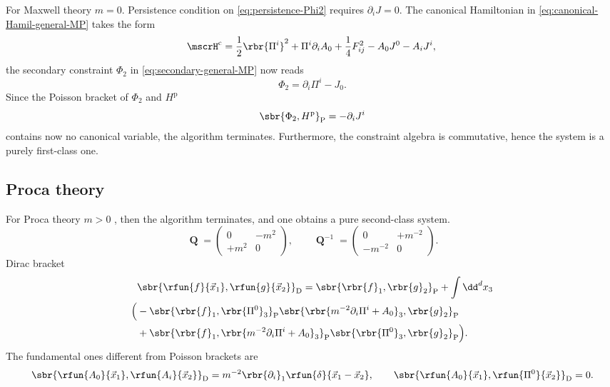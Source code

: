 \documentclass[a4paper,11pt]{article}
\begin{document}
For Maxwell theory $m = 0$. Persistence condition on \cref{eq:persistence-Phi2} 
requires $\partial_i J = 0$. The canonical Hamiltonian in 
\cref{eq:canonical-Hamil-general-MP} takes the form
\begin{equation}
\mscrH^\text{c} = \frac{1}{2} \rbr{\Pi^i}^2 + \Pi^i \partial_i A_0 + 
\frac{1}{4} 
F_{ij}^2 - A_0 J^0 - A_i J^i,\\
\end{equation}
the secondary constraint $\Phi_2$ in \cref{eq:secondary-general-MP} now 
reads
\begin{equation}
\Phi_2 = \partial_i \Pi^i - J_0.
\end{equation}
Since the Poisson bracket of $\Phi_2$ and $H^\text{p}$
\begin{equation}
\sbr{\Phi_2, H^\text{p}}_\text{P} = -\partial_i J^i
\end{equation}
contains now no canonical variable, the algorithm terminates. Furthermore, 
the constraint algebra is commutative, hence the system is a purely 
first-class one.




\subsection{Proca theory}

For Proca theory $m > 0$ , then the algorithm terminates, and one obtains a 
pure second-class system.
\begin{equation}
\mbfQ = \begin{pmatrix}0 & -m^2 \\ +m^2 & 0\end{pmatrix},
\qquad
\mbfQ^{-1} = \begin{pmatrix}0 & +m^{-2} \\ -m^{-2} & 0\end{pmatrix}.
\end{equation}
Dirac bracket
\begin{equation}
\begin{split}
&\phantom{}
\sbr{\rfun{f}{\vec{x}_1},\rfun{g}{\vec{x}_2}}_\text{D} =
\sbr{\rbr{f}_1, \rbr{g}_2}_\text{P} + \int \dd^d x_3 \\
\Bigl(&- \sbr{\rbr{f}_1, \rbr{\Pi^0}_3}_\text{P}
\sbr{\rbr{m^{-2}\partial_i \Pi^i + A_0}_3, \rbr{g}_2}_\text{P} \\
&+ \sbr{\rbr{f}_1, \rbr{m^{-2}\partial_i \Pi^i + A_0}_3}_\text{P}
\sbr{\rbr{\Pi^0}_3, \rbr{g}_2}_\text{P} \Bigr).
\end{split}
\end{equation}
The fundamental ones different from Poisson brackets are
\begin{equation}
\sbr{\rfun{A_0}{\vec{x}_1},\rfun{A_i}{\vec{x}_2}}_\text{D} =
m^{-2} \rbr{\partial_i}_1 \rfun{\delta}{\vec{x}_1 - \vec{x}_2},\qquad
\sbr{\rfun{A_0}{\vec{x}_1},\rfun{\Pi^0}{\vec{x}_2}}_\text{D} = 0.
\end{equation}
\end{document}
